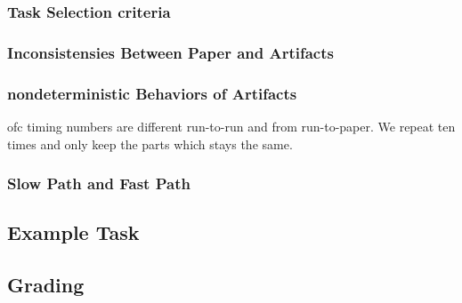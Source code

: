 \subsubsection{Task Selection criteria}
\label{s:task_selection_criteria}

\subsubsection{Inconsistensies Between Paper and Artifacts}
\label{s:inconsistencies}

\subsubsection{nondeterministic Behaviors of Artifacts}
\label{s:nondeterminism}

ofc timing numbers are different run-to-run and from run-to-paper.
We repeat ten times and only keep the parts which stays the same.

\subsubsection{Slow Path and Fast Path}
\label{s:slow_and_fast}

\subsection{Example Task}
\label{s:task_example}


\subsection{Grading}
\label{s:grading}


